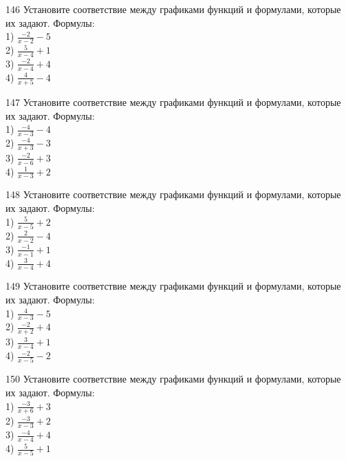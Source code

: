 \documentclass[4apaper]{article}
\begin{document}
\begin{taskBN}{146}
Установите соответствие между графиками функций и формулами, которые их задают. Формулы: \\1) $\frac{-2}{x-2}-5$\\2) $\frac{5}{x-4}+1$\\3) $\frac{-2}{x-4}+4$\\4) $\frac{4}{x+5}-4$
\end{taskBN}

\begin{taskBN}{147}
Установите соответствие между графиками функций и формулами, которые их задают. Формулы: \\1) $\frac{-4}{x-3}-4$\\2) $\frac{-4}{x+3}-3$\\3) $\frac{-2}{x-6}+3$\\4) $\frac{1}{x-3}+2$
\end{taskBN}

\begin{taskBN}{148}
Установите соответствие между графиками функций и формулами, которые их задают. Формулы: \\1) $\frac{5}{x-5}+2$\\2) $\frac{2}{x-2}-4$\\3) $\frac{-1}{x-1}+1$\\4) $\frac{3}{x-4}+4$
\end{taskBN}

\begin{taskBN}{149}
Установите соответствие между графиками функций и формулами, которые их задают. Формулы: \\1) $\frac{4}{x-3}-5$\\2) $\frac{-2}{x+2}+4$\\3) $\frac{3}{x-4}+1$\\4) $\frac{-2}{x-5}-2$
\end{taskBN}

\begin{taskBN}{150}
Установите соответствие между графиками функций и формулами, которые их задают. Формулы: \\1) $\frac{-3}{x+6}+3$\\2) $\frac{-3}{x-3}+2$\\3) $\frac{-4}{x-4}+4$\\4) $\frac{5}{x-5}+1$
\end{taskBN}
\end{document}
